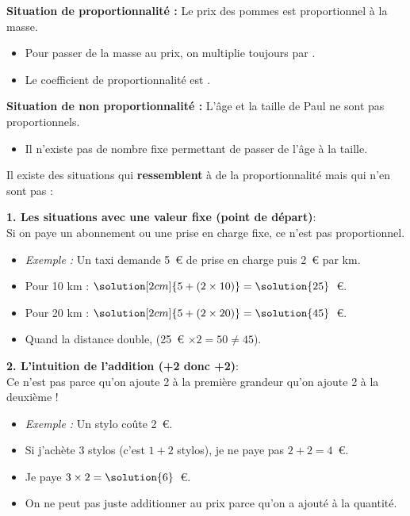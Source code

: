 \begin{examplebox}
	\textbf{Situation de proportionnalité :} Le prix des pommes est proportionnel à la masse.
	\begin{itemize}
		\item Pour passer de la masse au prix, on multiplie toujours par .
		\item Le coefficient de proportionnalité est .
	\end{itemize}

	\textbf{Situation de non proportionnalité :} L'âge et la taille de Paul ne sont pas proportionnels.
	\begin{itemize}
		\item Il n'existe pas de nombre fixe permettant de passer de l'âge à la taille.
	\end{itemize}
\end{examplebox}

\begin{remarkbox}
	Il existe des situations qui \textbf{ressemblent} à de la proportionnalité mais qui n'en sont pas :

	\textbf{1. Les situations avec une valeur fixe (\og point de départ\fg)}:\\
	Si on paye un abonnement ou une prise en charge fixe, ce n'est pas proportionnel.
	\begin{itemize}
		\item \textit{Exemple :} Un taxi demande 5~€ de prise en charge puis 2~€ par km.
		\item Pour 10 km : $\solution[2cm]{5 + (2 \times 10)} = \solution{25}$~€.
		\item Pour 20 km : $\solution[2cm]{5 + (2 \times 20)} = \solution{45}$~€.
		\item Quand la distance double,  (25~€ $\times 2 = 50 \neq 45$).
	\end{itemize}

	\textbf{2. L'intuition de l'addition (\og+2 donc +2\fg)}:\\
	Ce n'est pas parce qu'on ajoute 2 à la première grandeur qu'on ajoute 2 à la deuxième !
	\begin{itemize}
		\item \textit{Exemple :} Un stylo coûte 2~€.
		\item Si j'achète 3 stylos (c'est $1 + 2$ stylos), je ne paye pas $2 + 2 = 4$~€.
		\item Je paye $3 \times 2 = \solution{6}$~€.
		\item On ne peut pas juste additionner  \fg au prix parce qu'on a ajouté  \fg{} à la quantité.
	\end{itemize}
\end{remarkbox}

